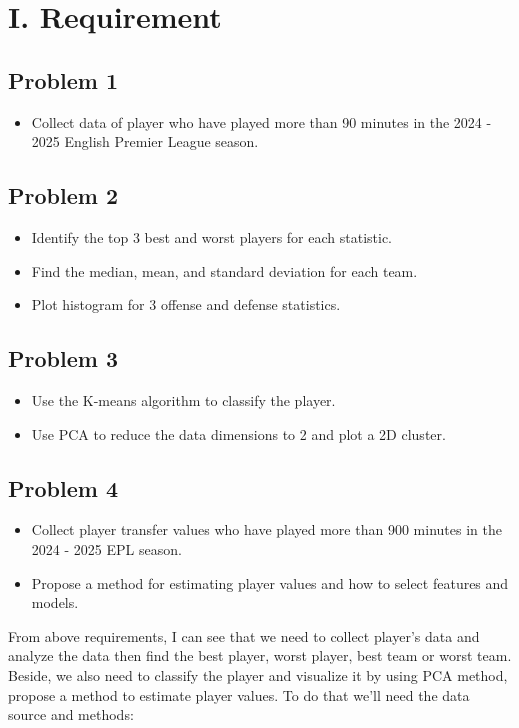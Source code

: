 \documentclass[a4paper,12pt]{article}
\begin{document}
\section*{I. Requirement}
\begin{itemize}[label= {-}, leftmargin= 1cm]
    \subsection*{Problem 1}
        \begin{itemize}[label= {-},  leftmargin= 2cm]
            \item Collect data of player who have played more than 90 minutes in the 2024 - 2025 English Premier League season.
        \end{itemize}

    \subsection*{Problem 2}
        \begin{itemize}[label= {-}, leftmargin= 2cm]
            \item Identify the top 3 best and worst players for each statistic.
            \item  Find the median, mean, and standard deviation for each team.
            \item  Plot histogram for 3 offense and defense statistics.
        \end{itemize}

    \subsection*{Problem 3}
        \begin{itemize}[label= {-}, leftmargin= 2cm]
            \item Use the K-means algorithm to classify the player.
            \item Use PCA to reduce the data dimensions to 2 and plot a 2D cluster.
        \end{itemize}

    \subsection*{Problem 4}
        \begin{itemize}[label= {-}, leftmargin= 2cm]
            \item Collect player transfer values who have played more than 900 minutes in the 2024 - 2025 EPL season.
            \item Propose a method for estimating player values and how to select features and models.
        \end{itemize}

\end{itemize}
From above requirements, I can see that we need to collect player's data and analyze the data then find the best player, worst player, best team or worst team. Beside, we also need to classify the player and visualize it by using PCA method, propose a method to estimate player values. To do that we'll need the data source and methods:
\end{document}
